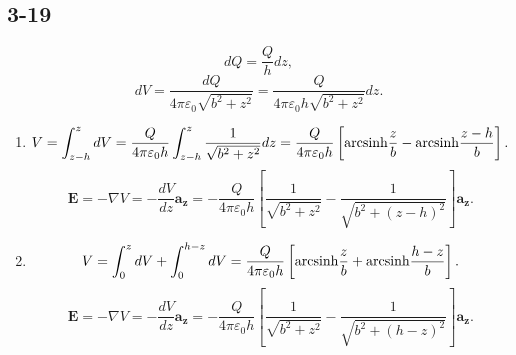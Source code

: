 \documentclass[11pt,a4paper]{article}
\begin{document}
\subsection{3-19}
$$dQ=\frac{Q}{h} dz,$$
$$dV=\frac{dQ}{4\pi\varepsilon_0\sqrt{b^2+z^2}}=\frac{Q}{4\pi\varepsilon_0h\sqrt{b^2+z^2}}dz.$$
\begin{enumerate}[label=\alph*)]
\item 
$$V=\int_{z-h}^zdV=\frac{Q}{4\pi\varepsilon_0h}\int_{z-h}^z\frac{1}{\sqrt{b^2+z^2}}dz=\frac{Q}{4\pi\varepsilon_0h}\left[{\rm arcsinh}\frac{z}{b}-{\rm arcsinh}\frac{z-h}{b}\right].$$
$$\mathbf{E}=-\nabla V=-\frac{dV}{dz}\mathbf{a_z}=-\frac{Q}{4\pi\varepsilon_0h}\left[\frac{1}{\sqrt{b^2+z^2}}-\frac{1}{\sqrt{b^2+(z-h)^2}}\right]\mathbf{a_z}.$$
\item
$$V=\int_0^zdV+\int_0^{h-z}dV=\frac{Q}{4\pi\varepsilon_0h}\left[{\rm arcsinh}\frac{z}{b}+{\rm arcsinh}\frac{h-z}{b}\right].$$
$$\mathbf{E}=-\nabla V=-\frac{dV}{dz}\mathbf{a_z}=-\frac{Q}{4\pi\varepsilon_0h}\left[\frac{1}{\sqrt{b^2+z^2}}-\frac{1}{\sqrt{b^2+(h-z)^2}}\right]\mathbf{a_z}.$$
\end{enumerate}
\end{document}
